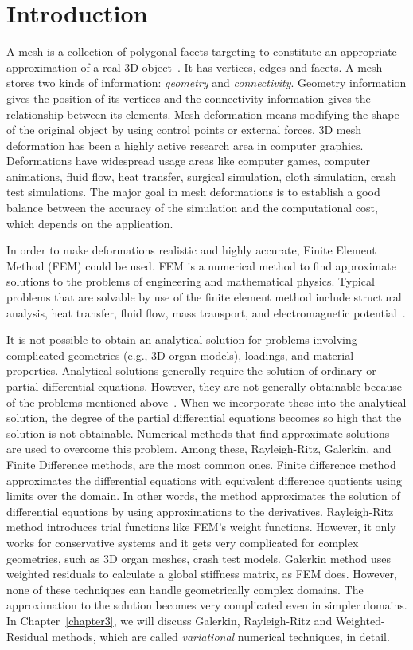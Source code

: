 \chapter{Introduction}
\label{chapter1}

A mesh is a collection of polygonal facets targeting to constitute an appropriate approximation of a real 3D object~\cite{Wang07}. It has vertices, edges and facets. A mesh stores two kinds of information: \textit{geometry} and \textit{connectivity}. Geometry information gives the position of its vertices and the connectivity information gives the relationship between its elements. Mesh deformation means modifying the shape of the original object by using control points or external forces. 3D mesh deformation has been a highly active research area in computer graphics. Deformations have widespread usage areas like computer games, computer animations, fluid flow, heat transfer, surgical simulation, cloth simulation, crash test simulations. The major goal in mesh deformations is to establish a good balance between the accuracy of the simulation and the computational cost, which depends on the application.

In order to make deformations realistic and highly accurate, Finite Element Method (FEM) could be used. FEM is a numerical method to find approximate solutions to the problems of engineering and mathematical physics. Typical problems that are solvable by use of the finite element method include structural analysis, heat transfer, fluid flow, mass transport, and electromagnetic potential~\cite{Logan07}.

It is not possible to obtain an analytical solution for problems involving complicated geometries (e.g., 3D organ models), loadings, and material properties. Analytical solutions generally require the solution of ordinary or partial differential equations. However, they are not generally obtainable because of the problems mentioned above~\cite{Logan07}. When we incorporate these into the analytical solution, the degree of the partial differential equations becomes so high that the solution is not obtainable. Numerical methods that find approximate solutions are used to overcome this problem. Among these, Rayleigh-Ritz, Galerkin, and Finite Difference methods, are the most common ones. Finite difference method approximates the differential equations with equivalent difference quotients using limits over the domain. In other words, the method approximates the solution of differential equations by using approximations to the derivatives. Rayleigh-Ritz method introduces trial functions like FEM's weight functions. However, it only works for conservative systems and it gets very complicated for complex geometries, such as 3D organ meshes, crash test models. Galerkin method uses weighted residuals to calculate a global stiffness matrix, as FEM does. However, none of these techniques can handle geometrically complex domains. The approximation to the solution becomes very complicated even in simpler domains. In Chapter~\ref{chapter3}, we will discuss Galerkin, Rayleigh-Ritz and Weighted-Residual methods, which are called \textit{variational} numerical techniques, in detail.

